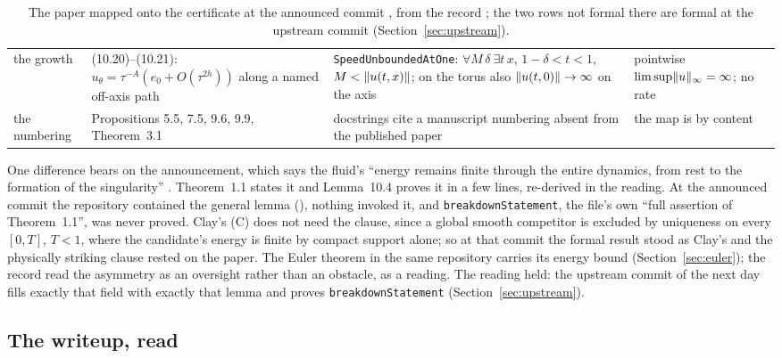 \documentclass[11pt]{article}
\newcommand{\lean}[1]{\texttt{#1}}
\begin{document}
\begin{table}[t]
\begin{tabular}{L{2.5cm}L{4.0cm}L{5.6cm}L{2.4cm}}
the growth & (10.20)--(10.21): $u_\theta=\tau^{-A}(e_0+O(\tau^{2h}))$ along a named off-axis path & \lean{SpeedUnboundedAtOne}: $\forall M\,\delta\ \exists t\,x$, $1-\delta<t<1$, $M<\lVert u(t,x) \rVert$; on the torus also $\lVert u(t,0) \rVert\to\infty$ on the axis & pointwise $\limsup\lVert u \rVert_\infty=\infty$; no rate \\
the numbering & Propositions 5.5, 7.5, 9.6, 9.9, Theorem~3.1 & docstrings cite a manuscript numbering absent from the published paper & the map is by content \\
\bottomrule\end{tabular}
\caption{The paper mapped onto the certificate at the announced commit \lean{\LeanCommit},
from the record \cite{Records}; the two rows not formal there are formal at the upstream
commit \lean{\UpCommit} (Section~\ref{sec:upstream}).}\label{tab:map}
\end{table}

One difference bears on the announcement, which says the fluid's ``energy remains finite
through the entire dynamics, from rest to the formation of the singularity'' \cite{OAIann}.
Theorem~1.1 states it and Lemma~10.4 proves it in a few lines, re-derived in the reading.
At the announced commit the repository contained the general lemma
(\lean{\UpLocLemma}), nothing invoked it, and \lean{breakdownStatement}, the file's own
``full assertion of Theorem~1.1'', was never proved. Clay's (C) does not need the clause,
since a global smooth competitor is excluded by uniqueness on every $[0,T]$, $T<1$, where the
candidate's energy is finite by compact support alone; so at that commit the formal result
stood as Clay's and the physically striking clause rested on the paper. The Euler theorem in
the same repository carries its energy bound (Section~\ref{sec:euler}); the record read the
asymmetry as an oversight rather than an obstacle, as a reading. The reading held: the
upstream commit of the next day fills exactly that field with exactly that lemma and proves
\lean{breakdownStatement} (Section~\ref{sec:upstream}).

\subsection{The writeup, read}\label{sec:read}
\end{document}
